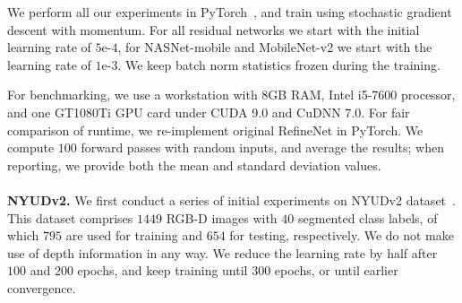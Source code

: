 \documentclass{bmvc2k}
\begin{document}
We perform all our experiments in PyTorch~\cite{paszke2017automatic}, and train using stochastic gradient descent with momentum. For all residual networks we start with the initial learning rate of $5$e-$4$, for NASNet-mobile and MobileNet-v2 we start with the learning rate of $1$e-$3$. We keep batch norm statistics frozen during the training.
	
For benchmarking, we use a workstation with $8$GB RAM, Intel i5-7600 processor, and one GT1080Ti GPU card under CUDA 9.0 and CuDNN 7.0. For fair comparison of runtime, we re-implement original RefineNet in PyTorch. We compute $100$ forward passes with random inputs, and average the results; when reporting, we provide both the mean and standard deviation values.\\
\\
\textbf{NYUDv2.} We first conduct a series of initial experiments on NYUDv2 dataset~\cite{SilbermanHKF12,GuptaAM13}. This dataset comprises $1449$ RGB-D images with $40$ segmented class labels, of which $795$ are used for training and $654$ for testing, respectively. We do not make use of depth information in any way. We reduce the learning rate by half after $100$ and $200$ epochs, and keep training until $300$ epochs, or until earlier convergence.

\begin{table}
\begin{center}
\end{center}
\caption{Quantitative results on the test sets of NYUDv2 and PASCAL Person-Part. Mean iou, the number of parameters and the runtime (mean$\pm$std) of one forward pass on $625\times468$ inputs are reported, where possible. Multi-scale evaluation is defined as \emph{msc}.\label{table:nyu-person}}
\vskip -0.15in
\end{table}
\end{document}
